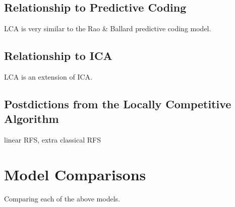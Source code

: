 \subsection{Relationship to Predictive Coding}
LCA is very similar to the Rao & Ballard predictive coding model.

\subsection{Relationship to ICA}
LCA is an extension of ICA.

\subsection{Postdictions from the Locally Competitive Algorithm}
linear RFS, extra classical RFS

\section{Model Comparisons}
Comparing each of the above models.